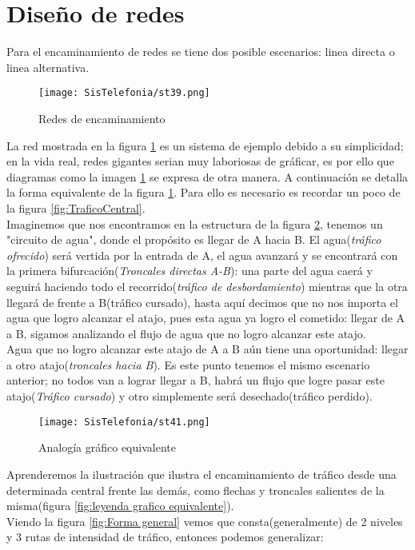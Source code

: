 \documentclass[
	12pt, %
	fleqn, %
	a4paper, %
	oneside, %
]{LegrandOrangeBook}
\begin{document}
\section{Diseño de redes}
Para el encaminamiento de redes se tiene dos posible escenarios: linea directa o linea alternativa.
\begin{figure}[ht]
\centering\texttt{[image: SisTelefonia/st39.png]}
\caption{Redes de encaminamiento}
\label{fig:Rutas}
\end{figure}
La red mostrada en la figura \ref{fig:Rutas} es un sistema de ejemplo debido a su simplicidad; en la vida real, redes gigantes serian muy laboriosas de gráficar, es por ello que diagramas como la imagen \ref{fig:Rutas} se expresa de otra manera. A continuación se detalla la forma equivalente de la figura \ref{fig:Rutas}. Para ello es necesario es recordar un poco de la figura \ref{fig:TraficoCentral}.\\
Imaginemos que nos encontramos en la estructura de la figura \ref{fig:analogia}, tenemos un "circuito de agua", donde el propósito es llegar de A hacia B. El agua(\textit{tráfico ofrecido}) será vertida por la entrada de A, el agua avanzará y se encontrará con la primera bifurcación(\textit{Troncales directas A-B}): una parte del agua caerá y seguirá haciendo todo el recorrido(\textit{tráfico de desbordamiento}) mientras que la otra llegará de frente a B(tráfico cursado), hasta aquí decimos que no nos importa el agua que logro alcanzar el atajo, pues esta agua ya logro el cometido: llegar de A a B, sigamos analizando el flujo de agua que no logro alcanzar este atajo.\\
Agua que no logro alcanzar este atajo de A a B aún tiene una oportunidad: llegar a otro atajo(\textit{troncales hacia B}). Es este punto tenemos el mismo escenario anterior; no todos van a lograr llegar a B, habrá un flujo que logre pasar este atajo(\textit{Tráfico cursado}) y otro simplemente será desechado(tráfico perdido).\\
\begin{figure}[H]
\centering\texttt{[image: SisTelefonia/st41.png]}
\caption{Analogía gráfico equivalente}
\label{fig:analogia}
\end{figure}
Aprenderemos la ilustración que ilustra el encaminamiento de tráfico desde una determinada central frente las demás, como flechas y troncales salientes de la misma(figura \ref{fig:leyenda grafico equivalente}). \\
Viendo la figura \ref{fig:Forma general} vemos que consta(generalmente) de 2 niveles y 3 rutas de intensidad de tráfico, entonces podemos generalizar:
\end{document}
